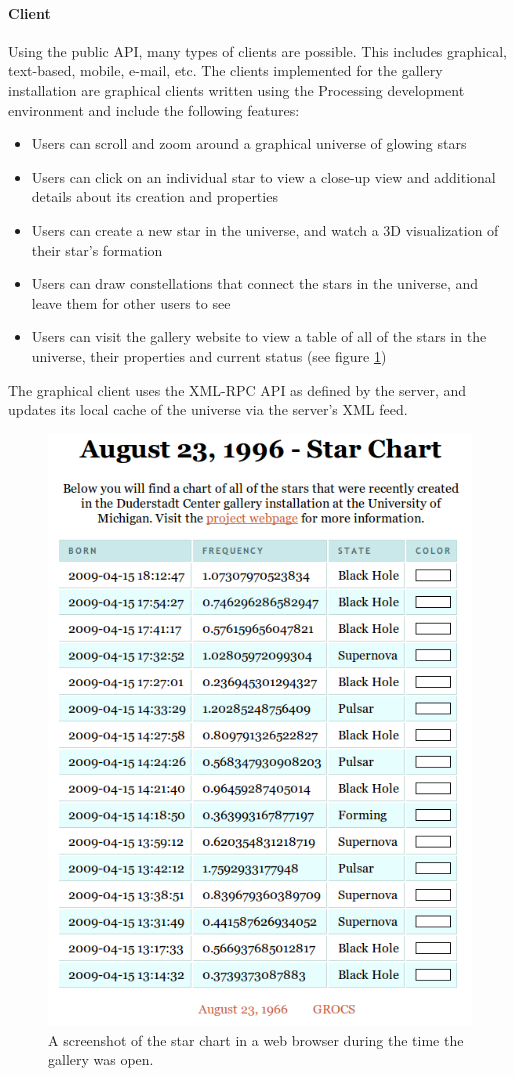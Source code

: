 \paragraph{Client}
Using the public API, many types of clients are possible. This includes graphical, text-based, mobile, e-mail, etc. The clients implemented for the gallery installation are graphical clients written using the Processing development environment and include the following features:
\begin{itemize}
\item Users can scroll and zoom around a graphical universe of glowing stars
\item Users can click on an individual star to view a close-up view and additional details about its creation and properties
\item Users can create a new star in the universe, and watch a 3D visualization of their star's formation
\item Users can draw constellations that connect the stars in the universe, and leave them for other users to see
\item Users can visit the gallery website to view a table of all of the stars in the universe, their properties and current status (see figure \ref{fig:starchart})
\end{itemize}
The graphical client uses the XML-RPC API as defined by the server, and updates its local cache of the universe via the server's XML feed.
\begin{figure}[htp]\centering
  \includegraphics[width=.4\textwidth]{images/starchart.png}
  \caption{A screenshot of the star chart in a web browser during the time the gallery was open.}\label{fig:starchart}
\end{figure}

